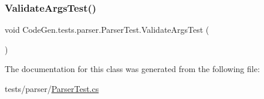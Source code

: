 \mbox{\label{classCodeGen_1_1tests_1_1parser_1_1ParserTest_ad2dd3e55f52ce80b354d70751bd6915a}} 
\subsubsection{\texorpdfstring{Validate\+Args\+Test()}{ValidateArgsTest()}}
{\footnotesize\ttfamily void Code\+Gen.\+tests.\+parser.\+Parser\+Test.\+Validate\+Args\+Test (\begin{DoxyParamCaption}{ }\end{DoxyParamCaption})\hspace{0.3cm}{\ttfamily [inline]}}







The documentation for this class was generated from the following file\+:\begin{DoxyCompactItemize}
\item 
tests/parser/\mbox{\hyperlink{ParserTest_8cs}{Parser\+Test.\+cs}}\end{DoxyCompactItemize}
